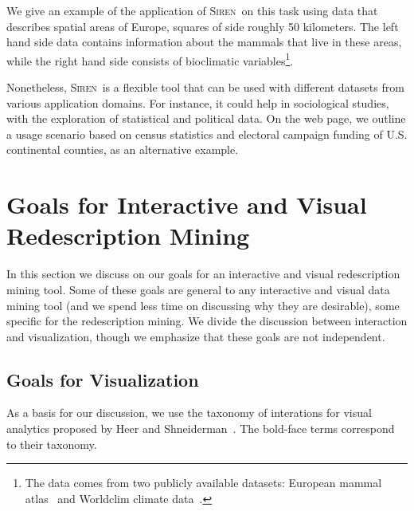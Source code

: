\documentclass{llncs}
\renewcommand{\note}[1]{{\color{red}{#1}\par}}
\newcommand{\Siren}{\textsc{Siren}}
\begin{document}
We give an example of the application of \Siren\ on this task using data
that describes spatial areas of Europe, squares of side roughly 50
kilometers.  The left hand side data contains information about the
mammals that live in these areas, while the right hand side consists
of bioclimatic variables\footnote{The data comes from two publicly available
datasets: European mammal atlas~\cite{mitchell-jones99atlas} and
Worldclim climate data~\cite{hijmans05very}.}.


Nonetheless, \Siren\ is a flexible tool that can be used with
different datasets from various application domains. For instance, it
could help in sociological studies, with the exploration of
statistical and political data. On the web page, we outline a usage scenario based on census
statistics and electoral campaign funding of U.S. continental counties, as an alternative example.



\section{Goals for Interactive and Visual Redescription Mining}
\label{sec:goals-inter-visu}

\note{Not this kind of list structure... + goals for interaction, too}

In this section we discuss on our goals for an interactive and visual
redescription mining tool. Some of these goals are general to any
interactive and visual data mining tool (and we spend less time on
discussing why they are desirable), some specific for the
redescription mining. We divide the discussion between interaction and
visualization, though we emphasize that these goals are not independent.

\subsection{Goals for Visualization}
\label{sec:goals-visualization}
 \note{I started writing this section open. You should get the idea,
   feel free to continue.}
As a basis for our discussion, we use the taxonomy of interations for
visual analytics proposed by Heer and
Shneiderman~\cite{Heer:2012:IDV:2133806.2133821}. The bold-face terms
correspond to their taxonomy.
\end{document}
